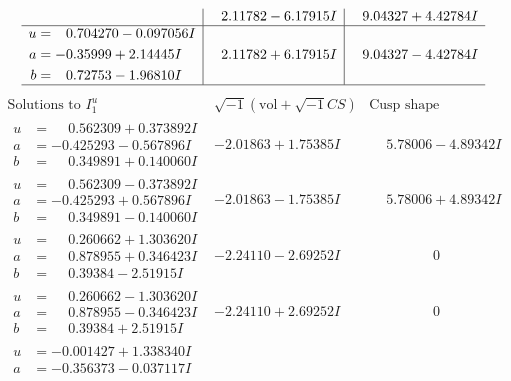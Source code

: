 \documentclass[1p]{elsarticle_modified}
\theoremstyle{definition}
\newcommand{\I}{\sqrt{-1}}
\begin{document}
$$\begin{array}{c|c|c}
 & \phantom{-}2.11782 - 6.17915 I & \phantom{-}9.04327 + 4.42784 I \\ \hline\begin{aligned}
u &= \phantom{-}0.704270 - 0.097056 I \\
a &= -0.35999 + 2.14445 I \\
b &= \phantom{-}0.72753 - 1.96810 I\end{aligned}
 & \phantom{-}2.11782 + 6.17915 I & \phantom{-}9.04327 - 4.42784 I\\
 \hline 
 \end{array}$$\newpage$$\begin{array}{c|c|c}  
\text{Solutions to }I^u_{1}& \I (\text{vol} + \sqrt{-1}CS) & \text{Cusp shape}\\
 \hline 
\begin{aligned}
u &= \phantom{-}0.562309 + 0.373892 I \\
a &= -0.425293 - 0.567896 I \\
b &= \phantom{-}0.349891 + 0.140060 I\end{aligned}
 & -2.01863 + 1.75385 I & \phantom{-}5.78006 - 4.89342 I \\ \hline\begin{aligned}
u &= \phantom{-}0.562309 - 0.373892 I \\
a &= -0.425293 + 0.567896 I \\
b &= \phantom{-}0.349891 - 0.140060 I\end{aligned}
 & -2.01863 - 1.75385 I & \phantom{-}5.78006 + 4.89342 I \\ \hline\begin{aligned}
u &= \phantom{-}0.260662 + 1.303620 I \\
a &= \phantom{-}0.878955 + 0.346423 I \\
b &= \phantom{-}0.39384 - 2.51915 I\end{aligned}
 & -2.24110 - 2.69252 I & \phantom{-0.000000 } 0 \\ \hline\begin{aligned}
u &= \phantom{-}0.260662 - 1.303620 I \\
a &= \phantom{-}0.878955 - 0.346423 I \\
b &= \phantom{-}0.39384 + 2.51915 I\end{aligned}
 & -2.24110 + 2.69252 I & \phantom{-0.000000 } 0 \\ \hline\begin{aligned}
u &= -0.001427 + 1.338340 I \\
a &= -0.356373 - 0.037117 I \\

\end{aligned}
\end{array}$$
\end{document}
